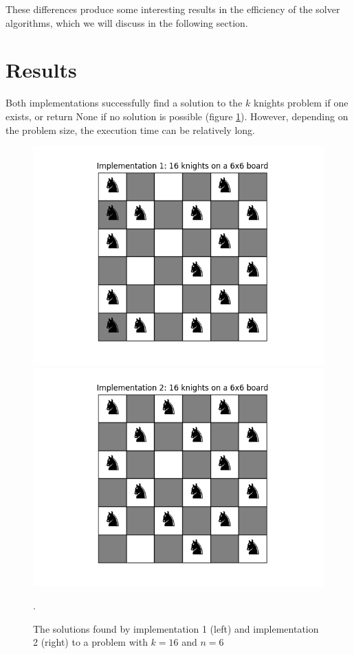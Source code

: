 \documentclass[a4paper,12pt]{article}
\begin{document}
These differences produce some interesting results in the efficiency of the solver algorithms, which we will discuss in the following section.

\section{Results} \label{sec:Results}
Both implementations successfully find a solution to the \(k\) knights problem if one exists, or return None if no solution is possible (figure \ref{fig:solutions}). However, depending on the problem size, the execution time can be relatively long.

\begin{figure}[H]
    \centering
    \begin{minipage}{0.45\textwidth}
        \centering
        \includegraphics[width = \textwidth]{images/im1_k16_n6.png}
    \end{minipage}
    \hfill
    \begin{minipage}{0.45\textwidth}
        \centering
        \includegraphics[width = \textwidth]{images/im2_k16_n6.png}
    \end{minipage}
    \caption{The solutions found by implementation 1 (left) and implementation 2 (right) to a problem with \(k = 16\) and \(n = 6\)}.
    \label{fig:solutions}
\end{figure}
\end{document}
